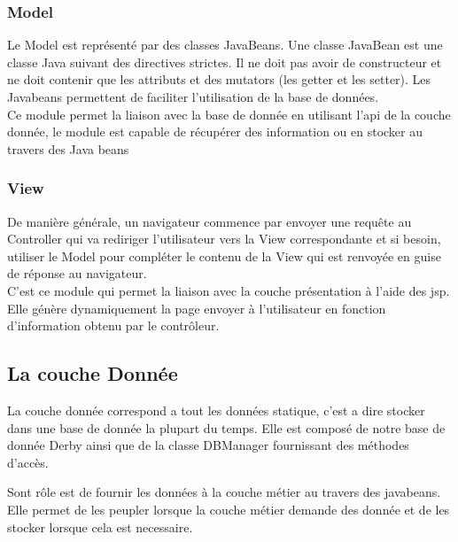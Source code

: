 \subsubsection{Model}
Le Model est représenté par des classes JavaBeans. Une classe JavaBean est une 
classe Java suivant des directives strictes. Il ne doit pas avoir de 
constructeur et ne doit contenir que les attributs et des mutators (les getter et les setter).
Les Javabeans permettent de faciliter l'utilisation de la base de données. \\
Ce module permet la liaison avec la base de donnée en utilisant l'api de la couche donnée, le module est capable de récupérer des information ou en stocker au travers des Java beans

\subsubsection{View}
De manière générale, un navigateur commence par envoyer une requête au 
Controller qui va rediriger l'utilisateur vers la View correspondante et si 
besoin, utiliser le Model pour compléter le contenu de la View qui est renvoyée en guise de réponse au navigateur.\\
C'est ce module qui permet la liaison avec la couche présentation à l'aide des jsp.
Elle génère dynamiquement la page envoyer à l'utilisateur en fonction d'information obtenu par le contrôleur.

\subsection{La couche Donnée}
La couche donnée correspond a tout les données statique, c'est a dire stocker dans une base de donnée la plupart du temps.
Elle est composé de notre base de donnée Derby ainsi que de la classe DBManager fournissant des méthodes d'accès.

Sont rôle est de fournir les données à la couche métier au travers des javabeans.
Elle permet de les peupler lorsque la couche métier demande des donnée et de les stocker lorsque cela est necessaire.
